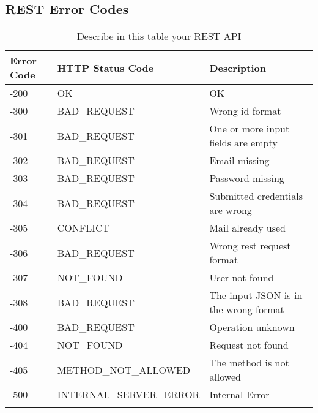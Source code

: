 \subsection{REST Error Codes}


\begin{longtable}{|p{}|p{} |p{}|} 
\hline
\textbf{Error Code} & \textbf{HTTP Status Code} & \textbf{Description} \\\hline

-200 & OK & OK \\\hline
-300 & BAD\_REQUEST & Wrong id format \\\hline
-301 & BAD\_REQUEST & One or more input fields are empty \\\hline
-302 & BAD\_REQUEST & Email missing \\\hline
-303 & BAD\_REQUEST & Password missing \\\hline
-304 & BAD\_REQUEST & Submitted credentials are wrong \\\hline
-305 & CONFLICT & Mail already used \\\hline
-306 & BAD\_REQUEST & Wrong rest request format \\\hline
-307 & NOT\_FOUND & User not found \\\hline
-308 & BAD\_REQUEST & The input JSON is in the wrong format \\\hline
-400 & BAD\_REQUEST & Operation unknown \\\hline
-404 & NOT\_FOUND & Request not found \\\hline
-405 & METHOD\_NOT\_ALLOWED &  The method is not allowed \\\hline
-500 & INTERNAL\_SERVER\_ERROR &  Internal Error \\\hline
\caption{Describe in this table your REST API}
\label{tab:termGlossary}
\end{longtable}
